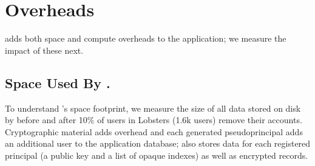 \section{\sys Overheads}
\label{s:eval-overheads}

\sys adds both space and compute overheads to the application; we measure the
impact of these next.

\subsection{Space Used By \sys.}

%
To understand \sys's space footprint, we measure the size of all data stored
on disk by \sys before and after 10\% of users in Lobsters (1.6k users)
remove their accounts.
%
%
Cryptographic material adds overhead and each generated pseudoprincipal adds an
additional user to the application database; \sys also stores data for each
registered principal (a public key and a list of opaque indexes) as well as
encrypted records.
%



